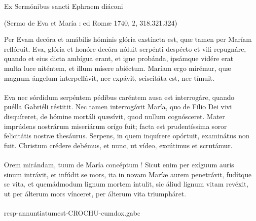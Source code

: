 \documentclass[options]{article}
\begin{document}
	
	Ex Sermónibus sancti Ephraem diáconi
	\begin{flushright}
			(Sermo de Eva et María : ed Romæ 1740, 2, 318.321.324)
	\end{flushright}
	Per Evam decóra et amábilis hóminis glória exstíncta est, quæ tamen per Maríam reflóruit. Eva, glória et honóre decóra nóluit serpénti despécto et vili repugnáre, quando et eius dicta ambígua erant, et igne probánda, ipsámque vidére erat multa luce niténtem, et illum mísere abiéctum. Maríam ergo mirémur, quæ magnum ángelum interpellávit, nec expávit, sciscitáta est, nec tímuit.\\
	\\
	Eva nec sórdidum serpéntem pédibus caréntem ausa est interrogáre, quando puélla Gabriéli réstitit. Nec tamen interrogávit María, quo de Fílio Dei vivi disquíreret, de hómine mortáli quæsívit, quod nullum cognósceret. Mater imprúdens nostrárum miseriárum orígo fuit; facta est prudentíssima soror felicitátis nostræ thesáurus. Serpens, in quem inquírere opórtuit, examinátus non fuit. Christum crédere debémus, et nunc, ut vídeo, excútimus et scrutámur.\\
	\\
	Orem mirándam, tuum de María concéptum ! Sicut enim per exíguum auris sinum intrávit, et infúdit se mors, ita in novam Maríæ aurem penetrávit, fudítque se vita, et quemádmodum lignum mortem íntulit, sic áliud lignum vitam revéxit, ut per álterum mors vínceret, per álterum vita triumpháret.\\
	\\
	resp-annuntiatumest-CROCHU-cumdox.gabc
\end{document}
